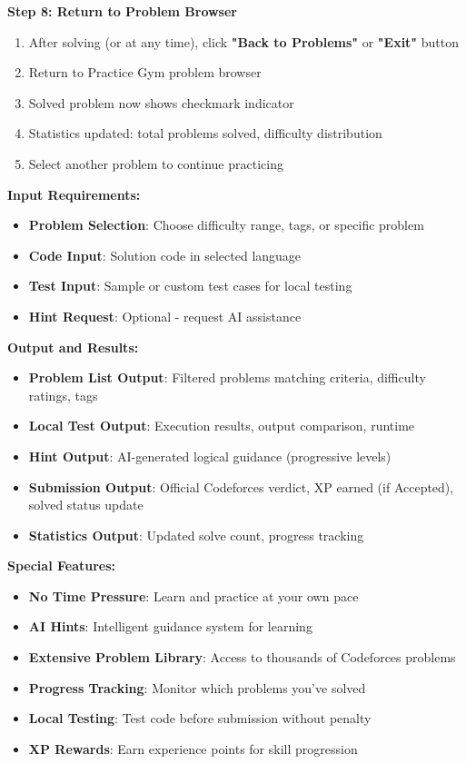 \documentclass[12pt,a4paper]{article}
\begin{document}
\textbf{Step 8: Return to Problem Browser}
\begin{enumerate}
\item After solving (or at any time), click \textbf{"Back to Problems"} or \textbf{"Exit"} button
\item Return to Practice Gym problem browser
\item Solved problem now shows checkmark indicator
\item Statistics updated: total problems solved, difficulty distribution
\item Select another problem to continue practicing
\end{enumerate}

\textbf{Input Requirements:}
\begin{itemize}[leftmargin=1.8em]
\item \textbf{Problem Selection}: Choose difficulty range, tags, or specific problem
\item \textbf{Code Input}: Solution code in selected language
\item \textbf{Test Input}: Sample or custom test cases for local testing
\item \textbf{Hint Request}: Optional - request AI assistance
\end{itemize}

\textbf{Output and Results:}
\begin{itemize}[leftmargin=1.8em]
\item \textbf{Problem List Output}: Filtered problems matching criteria, difficulty ratings, tags
\item \textbf{Local Test Output}: Execution results, output comparison, runtime
\item \textbf{Hint Output}: AI-generated logical guidance (progressive levels)
\item \textbf{Submission Output}: Official Codeforces verdict, XP earned (if Accepted), solved status update
\item \textbf{Statistics Output}: Updated solve count, progress tracking
\end{itemize}

\textbf{Special Features:}
\begin{itemize}[leftmargin=1.8em]
\item \textbf{No Time Pressure}: Learn and practice at your own pace
\item \textbf{AI Hints}: Intelligent guidance system for learning
\item \textbf{Extensive Problem Library}: Access to thousands of Codeforces problems
\item \textbf{Progress Tracking}: Monitor which problems you've solved
\item \textbf{Local Testing}: Test code before submission without penalty
\item \textbf{XP Rewards}: Earn experience points for skill progression
\end{itemize}
\end{document}
